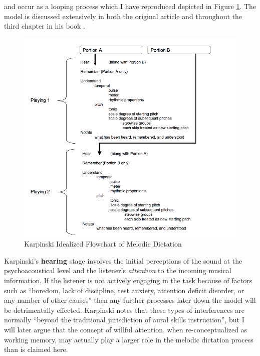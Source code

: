 \documentclass[]{book}
\begin{document}
and occur as a looping process which I have reproduced depicted in Figure \ref{fig:flowchart}.
The model is discussed extensively in both the original article \citep{karpinskiModelMusicPerception1990} and throughout the third chapter in his book \citep{karpinskiAuralSkillsAcquisition2000}.

\begin{figure}

{\centering \includegraphics[width=1\linewidth]{img/karpinski31} 

}

\caption{Karpinski Idealized Flowchart of Melodic Dictation}\label{fig:flowchart}
\end{figure}

Karpinski's \textbf{hearing} stage involves the initial perceptions of the sound at the psychoacoustical level and the listener's \emph{attention} to the incoming musical information.
If the listener is not actively engaging in the task because of factors such as ``boredom, lack of discipline, test anxiety, attention deficit disorder, or any number of other causes'' then any further processes later down the model will be detrimentally effected.
Karpinski notes that these types of interferences are normally ``beyond the traditional jurisdiction of aural skills instruction'', but I will later argue that the concept of willful attention, when re-conceptualized as working memory, may actually play a larger role in the melodic dictation process than is claimed here.
\end{document}

